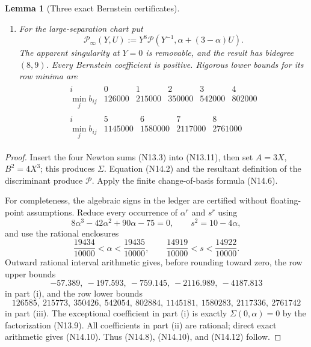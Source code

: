 \documentclass[11pt]{article}
\newtheorem{lemma}[theorem]{Lemma}
\theoremstyle{definition}
\theoremstyle{remark}
\begin{document}
\begin{lemma}[Three exact Bernstein certificates]
\begin{enumerate}[label=\textup{(\roman*)}]
\item For the large-separation chart put
\[
 \mathcal P_\infty(Y,U):=
 Y^8\mathcal P\!\left(Y^{-1},\alpha+(3-\alpha)U\right).
 \tag{N14.11}
\]
The apparent singularity at \(Y=0\) is removable, and the result has
bidegree \((8,9)\).  Every Bernstein coefficient is positive.  Rigorous
lower bounds for its row minima are
\[
\begin{gathered}
\begin{array}{c|rrrrr}
 i&0&1&2&3&4\\ \hline
 \min_j b_{ij}&126000&215000&350000&542000&802000
\end{array}\\[2mm]
\begin{array}{c|rrrr}
 i&5&6&7&8\\ \hline
 \min_j b_{ij}&1145000&1580000&2117000&2761000
\end{array}
\end{gathered}
\tag{N14.12}
\]
\end{enumerate}
\end{lemma}

\begin{proof}
Insert the four Newton sums \textup{(N13.3)} into
\textup{(N13.11)}, then set \(A=3X\), \(B^2=4X^3\); this produces
\(\Sigma\).  Equation \textup{(N14.2)} and the resultant definition of the
discriminant produce \(\mathcal P\).  Apply the finite change-of-basis
formula \textup{(N14.6)}.

For completeness, the algebraic signs in the ledger are certified without
floating-point assumptions.  Reduce every occurrence of \(\alpha^r\) and
\(s^r\) using
\[
 8\alpha^3-42\alpha^2+90\alpha-75=0,
 \qquad s^2=10-4\alpha,
 \tag{N14.13}
\]
and use the rational enclosures
\[
 \frac{19434}{10000}<\alpha<\frac{19435}{10000},
 \qquad
 \frac{14919}{10000}<s<\frac{14922}{10000}.
 \tag{N14.14}
\]
Outward rational interval arithmetic gives, before rounding toward zero,
the row upper bounds
\[
 -57.389,\ -197.593,\ -759.145,\ -2116.989,\ -4187.813
 \tag{N14.15}
\]
in part \textup{(i)}, and the row lower bounds
\[
 126585,\ 215773,\ 350426,\ 542054,\ 802884,\
 1145181,\ 1580283,\ 2117336,\ 2761742
 \tag{N14.16}
\]
in part \textup{(iii)}.  The exceptional coefficient in part
\textup{(i)} is exactly
\(\Sigma(0,\alpha)=0\) by the factorization \textup{(N13.9)}.
All coefficients in part \textup{(ii)} are rational; direct exact
arithmetic gives \textup{(N14.10)}.  Thus
\textup{(N14.8)}, \textup{(N14.10)}, and \textup{(N14.12)} follow.
\end{proof}
\end{document}
